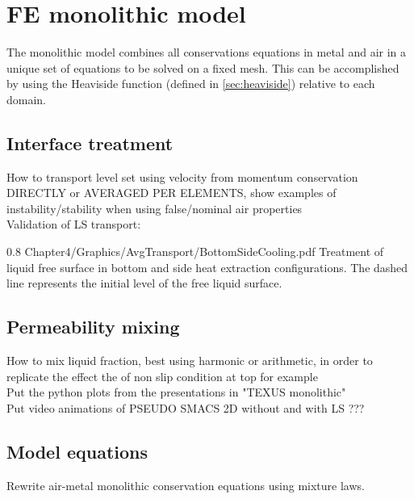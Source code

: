 \section{FE monolithic model}
The monolithic model combines all conservations equations in metal and air in a unique set of equations to be solved on a fixed mesh. 
This can be accomplished by using the Heaviside function (defined in \cref{sec:heaviside}) relative to each domain.
%
\subsection{Interface treatment}
How to transport level set using velocity from momentum conservation DIRECTLY or AVERAGED PER ELEMENTS, 
show examples of instability/stability when using false/nominal air properties \\ 
Validation of LS transport:
%
\begin{figureth}
{0.8}
{Chapter4/Graphics/AvgTransport/BottomSideCooling.pdf}
{Treatment of liquid free surface in bottom and side heat extraction configurations. The dashed line represents the 
initial level of the free liquid surface.}
\label{fig:free_liquid_surface}
\end{figureth}
%
\subsection{Permeability mixing}
How to mix liquid fraction, best using harmonic or arithmetic, in order to replicate the effect the of non slip condition at top for example \\
Put the python plots from the presentations in "TEXUS monolithic" \\
Put video animations of PSEUDO SMACS 2D without and with LS ???
\subsection{Model equations}
Rewrite air-metal monolithic conservation equations using mixture laws.
